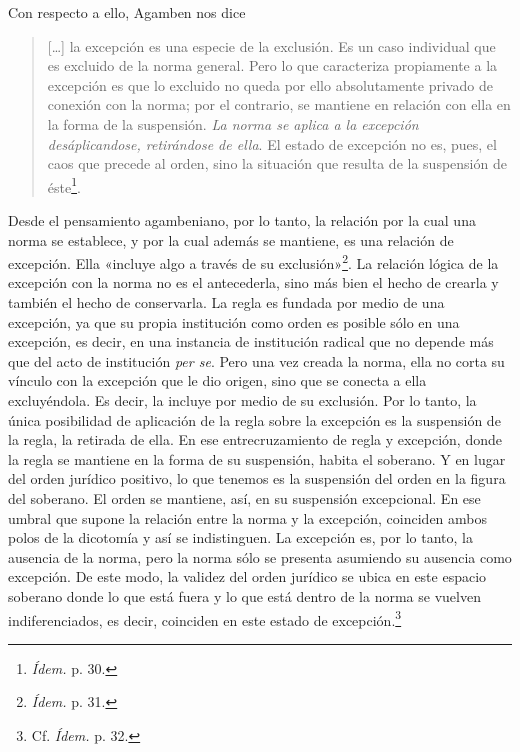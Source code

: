 Con respecto a ello, Agamben nos dice

\begin{quote}
{[}\ldots{]} la excepción es una especie de la exclusión. Es un caso individual que es excluido de la norma general. Pero lo que caracteriza propiamente a la excepción es que lo excluido no queda por ello absolutamente privado de conexión con la norma; por el contrario, se mantiene en relación con ella en la forma de la suspensión. \emph{La norma se aplica a la excepción desáplicandose, retirándose de ella}. El estado de excepción no es, pues, el caos que precede al orden, sino la situación que resulta de la suspensión de éste\footnote{\emph{Ídem.} p. 30.}.
\end{quote}

Desde el pensamiento agambeniano, por lo tanto, la relación por la cual una norma se establece, y por la cual además se mantiene, es una relación de excepción. Ella «incluye algo a través de su exclusión»\footnote{\emph{Ídem.} p. 31.}. La relación lógica de la excepción con la norma no es el antecederla, sino más bien el hecho de crearla y también el hecho de conservarla. La regla es fundada por medio de una excepción, ya que su propia institución como orden es posible sólo en una excepción, es decir, en una instancia de institución radical que no depende más que del acto de institución \emph{per se}. Pero una vez creada la norma, ella no corta su vínculo con la excepción que le dio origen, sino que se conecta a ella excluyéndola. Es decir, la incluye por medio de su exclusión. Por lo tanto, la única posibilidad de aplicación de la regla sobre la excepción es la suspensión de la regla, la retirada de ella. En ese entrecruzamiento de regla y excepción, donde la regla se mantiene en la forma de su suspensión, habita el soberano. Y en lugar del orden jurídico positivo, lo que tenemos es la suspensión del orden en la figura del soberano. El orden se mantiene, así, en su suspensión excepcional. En ese umbral que supone la relación entre la norma y la excepción, coinciden ambos polos de la dicotomía y así se indistinguen. La excepción es, por lo tanto, la ausencia de la norma, pero la norma sólo se presenta asumiendo su ausencia como excepción. De este modo, la validez del orden jurídico se ubica en este espacio soberano donde lo que está fuera y lo que está dentro de la norma se vuelven indiferenciados, es decir, coinciden en este estado de excepción.\footnote{Cf. \emph{Ídem.} p. 32.}

